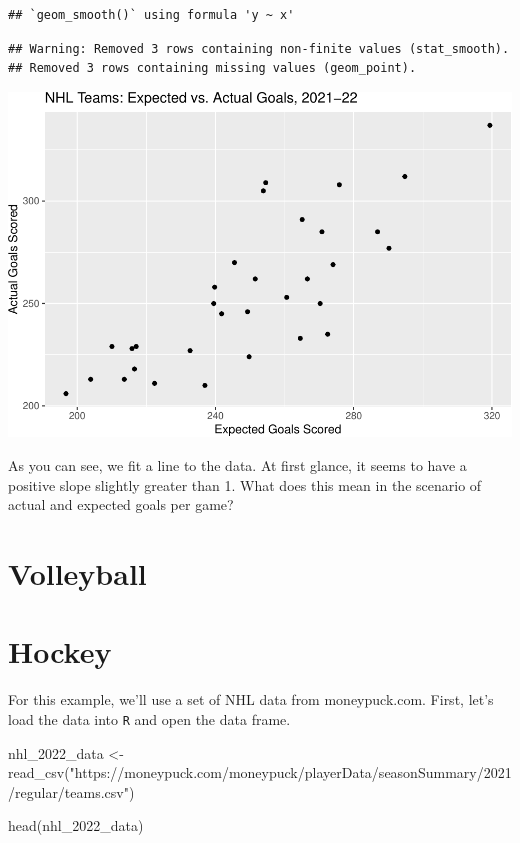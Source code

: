 \documentclass[
  11pt,
]{book}
\newenvironment{Shaded}{\begin{snugshade}}{\end{snugshade}}
\newcommand{\FunctionTok}[1]{\textcolor[rgb]{0.00,0.00,0.00}{#1}}
\newcommand{\NormalTok}[1]{#1}
\newcommand{\OtherTok}[1]{\textcolor[rgb]{0.56,0.35,0.01}{#1}}
\newcommand{\StringTok}[1]{\textcolor[rgb]{0.31,0.60,0.02}{#1}}
\theoremstyle{definition}
\theoremstyle{definition}
\theoremstyle{definition}
\theoremstyle{definition}
\theoremstyle{remark}
\begin{document}
\begin{verbatim}
## `geom_smooth()` using formula 'y ~ x'
\end{verbatim}

\begin{verbatim}
## Warning: Removed 3 rows containing non-finite values (stat_smooth).
## Removed 3 rows containing missing values (geom_point).
\end{verbatim}

\includegraphics{series_files/figure-latex/unnamed-chunk-15-1.pdf}

As you can see, we fit a line to the data. At first glance, it seems to have a positive slope slightly greater than 1. What does this mean in the scenario of actual and expected goals per game?

\hypertarget{volleyball}{%
\section{Volleyball}\label{volleyball}}

\hypertarget{hockey}{%
\section{Hockey}\label{hockey}}

For this example, we'll use a set of NHL data from moneypuck.com. First, let's load the data into \texttt{R} and open the data frame.

\begin{Shaded}
\begin{Highlighting}[]
\NormalTok{nhl\_2022\_data }\OtherTok{\textless{}{-}} \FunctionTok{read\_csv}\NormalTok{(}\StringTok{"https://moneypuck.com/moneypuck/playerData/seasonSummary/2021/regular/teams.csv"}\NormalTok{)}

\FunctionTok{head}\NormalTok{(nhl\_2022\_data)}
\end{Highlighting}
\end{Shaded}
\end{document}
